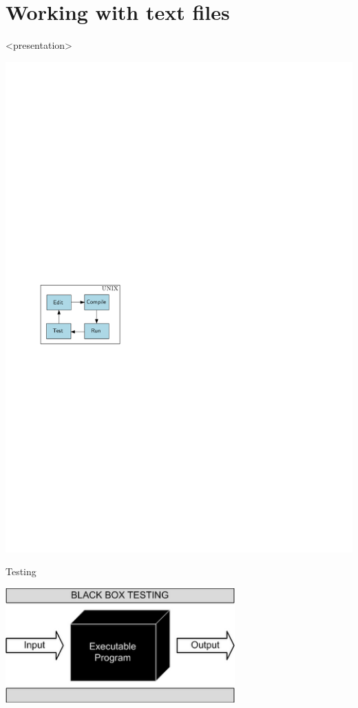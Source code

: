 
\section{Working with text files} %

\begin{frame}<presentation>
\begin{center}
\includegraphics[page=4,width=\textwidth]{flow}
\end{center}
\end{frame}

\begin{frame}{Testing}
\begin{center}
\includegraphics[width=250pt]{bbtesting}
\end{center}
\end{frame}

